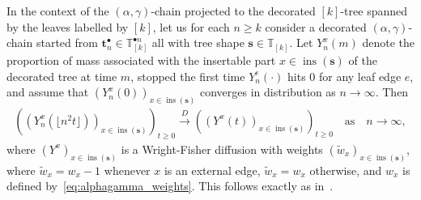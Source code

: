 \documentclass[a4paper, final]{amsart}
\theoremstyle{plain}
\theoremstyle{definition}
\newcommand{\tree}[1][t]{\boldsymbol{#1}}
\newcommand{\T}{\mathbb{T}}
\DeclareMathOperator{\insertable}{ins}
\newcommand{\insertablef}[1][\tree]{\insertable({\tree[#1]})}
\newcommand{\dcon}{\xrightarrow{D}}
\begin{document}
In the context of the $(\alpha, \gamma)$-chain projected to the decorated $[k]$-tree spanned by the leaves labelled by $[k]$, let us for each $n \geq k$ consider a decorated $(\alpha, \gamma)$-chain started from $\tree_n^\bullet \in \T_{[k]}^{\bullet n}$ all with tree shape $\tree[s] \in \T_{[k]}$.
Let $Y_n^x(m)$ denote the proportion of mass associated with the insertable part $x \in \insertablef[s]$ of the decorated tree at time $m$, stopped the first time $Y_n^e (\cdot)$ hits $0$ for any leaf edge $e$, and assume that ${\left( Y_n^x(0) \right)}_{x \in \insertablef[s]}$ converges in distribution as $n \to \infty$.
Then
%
\begin{align}
  {\left( {\left( Y_n^x ( \lfloor n^2 t \rfloor ) \right)}_{x \in \insertablef[s]} \right)}_{t \geq 0}
  \dcon {\left( {\left( Y^x(t) \right)}_{x \in \insertablef[s]} \right)}_{t \geq 0}
    \quad \text{as} \quad n \to \infty,
  \label{eq:WF_general}
\end{align}
%
where ${\left( Y^x \right)}_{x \in \insertablef[s]}$ is a Wright-Fisher diffusion with weights ${\left( \tilde{w}_x \right)}_{x \in \insertablef[s]}$, where $\tilde{w}_x = w_x - 1$ whenever $x$ is an external edge, $\tilde{w}_x = w_x$ otherwise, and $w_x$ is defined by~\eqref{eq:alphagamma_weights}.
This follows exactly as in~\cite{RefWorks:doc:5b4cbb92e4b0bc982fe42f3a}.
\end{document}
